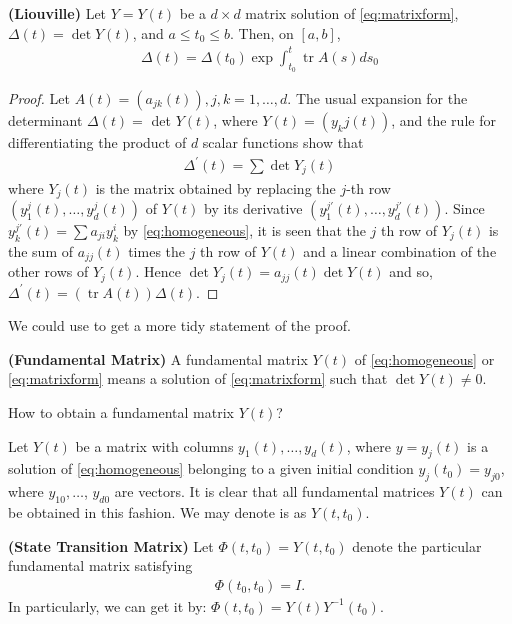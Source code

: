 \documentclass{article}
\newcommand{\bfs}[1]{\textbf{({#1}) }}
\begin{document}
\begin{thma}\bfs{Liouville}\label{thm:Liouville}
 Let $Y=Y(t)$ be a $d \times d$ matrix solution of \cref{eq:matrixform}, $\Delta(t)=\operatorname{det} Y(t)$, and $a \le t_{0} \le b .$ Then, on $[a, b]$,
\begin{align}
\Delta(t)=\Delta\left(t_{0}\right) \exp \int_{t_{0}}^{t} \operatorname{tr} A(s) d s_{0}
\end{align}
\end{thma} 
\begin{proof}
Let $A(t)=\left(a_{j k}(t)\right), j, k=1, \ldots, d$. The usual expansion for the determinant $\Delta(t)=$ det $Y(t)$, where $Y(t)=\left(y_{k}{j}(t)\right)$, and the rule for differentiating the product of $d$ scalar functions show that
\begin{align*}
\Delta^{\prime}(t)=\sum \operatorname{det} Y_{j}(t)
\end{align*}
where $Y_{j}(t)$ is the matrix obtained by replacing the $j$-th row $\left(y_{1}^{j}(t), \ldots,y_{d}^{j}(t)\right)$ of $Y(t)$ by its derivative $\left(y_{1}^{j{\prime}}(t), \ldots, y_{d}^{j{\prime}}(t)\right)$. Since $y_{k}^{j{\prime}}(t)=\sum a_{j i} y_{k}^{i}$ by \cref{eq:homogeneous}, it is seen that the $j$ th row of $Y_{j}(t)$ is the sum of $a_{j j}(t)$ times the $j$ th row of $Y(t)$ and a linear combination of the other rows of $Y_{j}(t)$. Hence $\operatorname{det} Y_{j}(t)=a_{j j}(t)\det Y(t)$ and so, $\Delta^{\prime}(t)=(\operatorname{tr} A(t)) \Delta(t)$. 
\end{proof}
\begin{rema}
We could use \cite[eq. 0.8.10.1 and eq. 0.8.2.2]{horn2012matrix} to get a more tidy statement of the proof.
\end{rema}
\begin{defa}\bfs{Fundamental Matrix}
A fundamental matrix $Y(t)$ of \cref{eq:homogeneous} or \cref{eq:matrixform} means a solution of \cref{eq:matrixform} such that  $\det Y(t) \neq 0$. 
\end{defa}
 How to obtain a fundamental matrix $Y(t)$?

 Let $Y(t)$ be a matrix with columns $y_{1}(t), \ldots, y_{d}(t)$, where $y=y_{j}(t)$ is a solution of \cref{eq:homogeneous} belonging to a given initial condition $y_{j}\left(t_{0}\right)=y_{j 0}$, where $y_{10}, \ldots$, $y_{d 0}$ are  vectors. It is clear that all fundamental matrices $Y(t)$ can be obtained in this fashion. We may denote is as $Y(t,t_0)$.

\begin{defa}\bfs{State Transition Matrix}
Let $\Phi(t,t_0)=Y\left(t, t_{0}\right)$ denote the particular fundamental matrix satisfying
\begin{align}
\Phi\left(t_{0}, t_{0}\right)=I.
\end{align}
In particularly, we can get it by:
$\Phi(t,t_0)=Y(t)Y^{-1}(t_0)$.
\end{defa}
\end{document}
